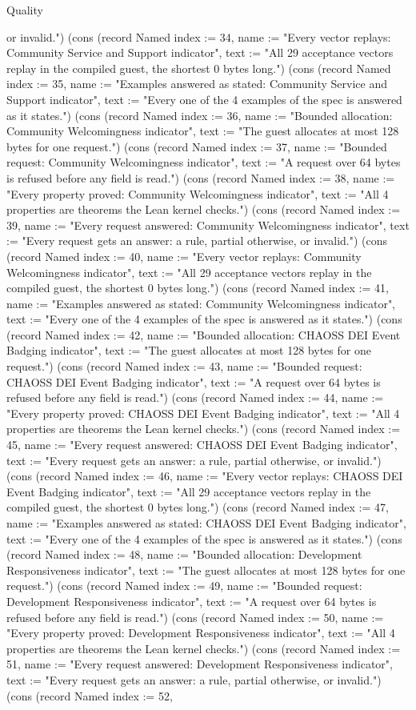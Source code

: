 \begin{lexlean}{Quality}
\begin{semanticmodule}
{or invalid."}) (cons (record Named {index := 34, name := "Every vector replays: Community Service and Support indicator", text := "All 29 acceptance vectors replay in the compiled guest, the shortest 0 bytes long."}) (cons (record Named {index := 35, name := "Examples answered as stated: Community Service and Support indicator", text := "Every one of the 4 examples of the spec is answered as it states."}) (cons (record Named {index := 36, name := "Bounded allocation: Community Welcomingness indicator", text := "The guest allocates at most 128 bytes for one request."}) (cons (record Named {index := 37, name := "Bounded request: Community Welcomingness indicator", text := "A request over 64 bytes is refused before any field is read."}) (cons (record Named {index := 38, name := "Every property proved: Community Welcomingness indicator", text := "All 4 properties are theorems the Lean kernel checks."}) (cons (record Named {index := 39, name := "Every request answered: Community Welcomingness indicator", text := "Every request gets an answer: a rule, partial otherwise, or invalid."}) (cons (record Named {index := 40, name := "Every vector replays: Community Welcomingness indicator", text := "All 29 acceptance vectors replay in the compiled guest, the shortest 0 bytes long."}) (cons (record Named {index := 41, name := "Examples answered as stated: Community Welcomingness indicator", text := "Every one of the 4 examples of the spec is answered as it states."}) (cons (record Named {index := 42, name := "Bounded allocation: CHAOSS DEI Event Badging indicator", text := "The guest allocates at most 128 bytes for one request."}) (cons (record Named {index := 43, name := "Bounded request: CHAOSS DEI Event Badging indicator", text := "A request over 64 bytes is refused before any field is read."}) (cons (record Named {index := 44, name := "Every property proved: CHAOSS DEI Event Badging indicator", text := "All 4 properties are theorems the Lean kernel checks."}) (cons (record Named {index := 45, name := "Every request answered: CHAOSS DEI Event Badging indicator", text := "Every request gets an answer: a rule, partial otherwise, or invalid."}) (cons (record Named {index := 46, name := "Every vector replays: CHAOSS DEI Event Badging indicator", text := "All 29 acceptance vectors replay in the compiled guest, the shortest 0 bytes long."}) (cons (record Named {index := 47, name := "Examples answered as stated: CHAOSS DEI Event Badging indicator", text := "Every one of the 4 examples of the spec is answered as it states."}) (cons (record Named {index := 48, name := "Bounded allocation: Development Responsiveness indicator", text := "The guest allocates at most 128 bytes for one request."}) (cons (record Named {index := 49, name := "Bounded request: Development Responsiveness indicator", text := "A request over 64 bytes is refused before any field is read."}) (cons (record Named {index := 50, name := "Every property proved: Development Responsiveness indicator", text := "All 4 properties are theorems the Lean kernel checks."}) (cons (record Named {index := 51, name := "Every request answered: Development Responsiveness indicator", text := "Every request gets an answer: a rule, partial otherwise, or invalid."}) (cons (record Named {index := 52, }
\end{semanticmodule}
\end{lexlean}
